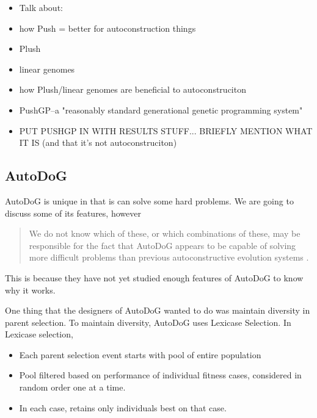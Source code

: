 \documentclass{sig-alternate}
\begin{document}

\begin{itemize}
	\item Talk about:
	\item how Push = better for autoconstruction things
	\item Plush
	\item linear genomes
	\item how Plush/linear genomes are beneficial to autoconstruciton
	\item PushGP--a "reasonably standard generational genetic programming system"
	\item PUT PUSHGP IN WITH RESULTS STUFF... BRIEFLY MENTION WHAT IT IS (and that it's not autoconstruciton)
\end{itemize}


\subsection{AutoDoG}
\label{sec:autodog}
AutoDoG is unique in that is can solve some hard problems.  We are going to discuss some of its features, however
\begin{quotation}
	We do not know which of these, or which combinations of these, may be responsible for the fact that AutoDoG appears to be capable of solving more difficult problems than previous autoconstructive evolution systems \cite{spector:2016}.
\end{quotation}
This is because they have not yet studied enough features of AutoDoG to know why it works.

One thing that the designers of AutoDoG wanted to do was maintain diversity in parent selection. To maintain diversity, AutoDoG uses Lexicase Selection. In Lexicase selection,
\begin{itemize}
	\item Each parent selection event starts with pool of entire population
	\item Pool filtered based on performance of individual fitness cases, considered in random order one at a time.
	\item In each case, retains only individuals best on that case.
\end{itemize}
\end{document}
